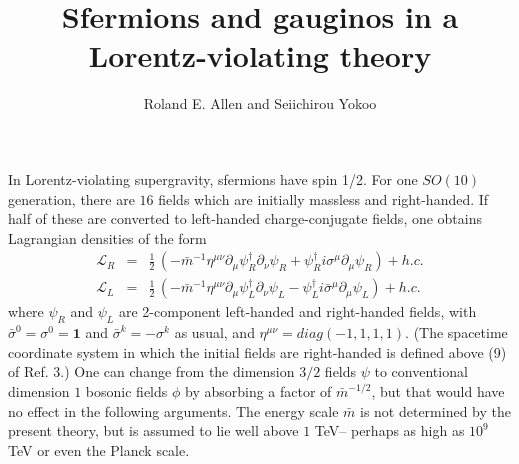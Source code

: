 \documentclass{ws-procs9x6}
\begin{document}
\title{Sfermions and gauginos in a Lorentz-violating theory}
\author{Roland E. Allen and Seiichirou Yokoo}
\maketitle

\address{Physics Department, Texas A\&M University \\
College Station, Texas 77843 \\
E-mail: allen@tamu.edu}


In Lorentz-violating supergravity\cite{allen-2002,allen-2003}, sfermions
have spin 1/2. For one $SO\left( 10\right) $ generation, there are $16$
fields which are initially massless and right-handed. If half of these are
converted to left-handed charge-conjugate fields\cite
{allen-yokoo-2003,allen-yokoo-2004}, one obtains Lagrangian densities of the
form
\begin{eqnarray}
\mathcal{L}_{R} &=&\frac{1}{2}\,\left( -\bar{m}^{-1}\eta ^{\mu \nu }\partial
_{\mu }\psi _{R}^{\dagger }\partial _{\nu }\psi _{R}+\psi _{R}^{\dagger
}i\sigma ^{\mu }\partial _{\mu }\psi _{R}\right) +h.c. \\
\mathcal{L}_{L} &=&\frac{1}{2}\,\left( -\bar{m}^{-1}\eta ^{\mu \nu }\partial
_{\mu }\psi _{L}^{\dagger }\partial _{\nu }\psi _{L}-\psi _{L}^{\dagger }i
\bar{\sigma}^{\mu }\partial _{\mu }\psi _{L}\right) +h.c.
\end{eqnarray}
where $\psi _{R}$ and $\psi _{L}$ are 2-component left-handed and
right-handed fields, with $\bar{\sigma}^{0}=\sigma ^{0}=\mathbf{1}$ and
$\bar{\sigma}^{k}=-\sigma ^{k}$ as usual, and $\eta ^{\mu \nu
}=diag(-1,1,1,1) $. (The spacetime coordinate system in which the initial
fields are right-handed is defined above (9) of Ref. 3.) One can change from
the dimension $3/2$ fields $\psi $ to conventional dimension $1$ bosonic
fields $\phi $ by absorbing a factor of $\bar{m}^{-1/2}$, but that would
have no effect in the following arguments. The energy scale $\bar{m}$ is not
determined by the present theory, but is assumed to lie well above $1$ TeV--
perhaps as high as $10^{9}$ TeV or even the Planck scale.
\end{document}
